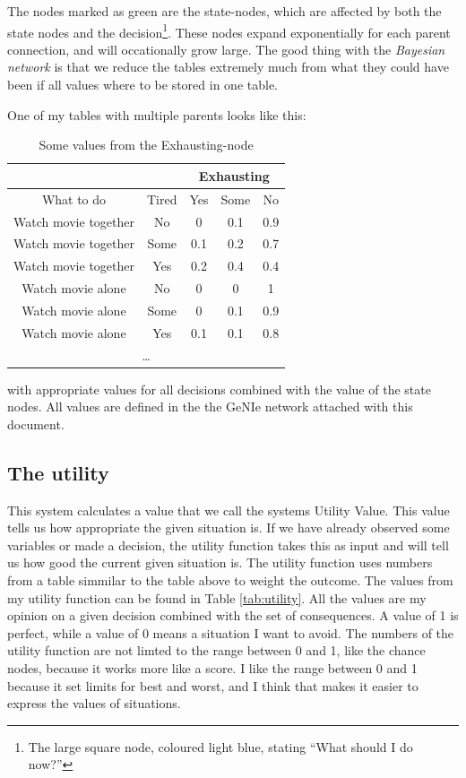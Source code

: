 The nodes marked as green are the state-nodes, which are affected by both
the state nodes and the decision\footnote{The large square node, coloured
light blue, stating ``What should I do now?''}. These nodes expand exponentially for
each parent connection, and will occationally grow large. The good thing with
the \emph{Bayesian network} is that we reduce the tables extremely much from
what they could have been if all values where to be stored in one table.

One of my tables with multiple parents looks like this:
\begin{table}[h!!!!!!!!!!!!!!!!!!]
\begin{tabular}{|c|c||c|c|c|}
\hline
\multicolumn{2}{|c|}{} & \multicolumn{3}{|c|}{Exhausting}\\
\hline
What to do & Tired & Yes & Some & No \\
\hline
\hline
Watch movie together & No & 0 & 0.1 & 0.9\\
Watch movie together & Some & 0.1 & 0.2 & 0.7\\
Watch movie together & Yes & 0.2 & 0.4 & 0.4\\
\hline
Watch movie alone & No & 0 & 0 & 1\\
Watch movie alone & Some & 0 & 0.1 & 0.9\\
Watch movie alone & Yes & 0.1 & 0.1 & 0.8\\
\hline
\multicolumn{5}{c}{\ldots}\\
\end{tabular}
\caption{Some values from the Exhausting-node}
\label{tab:exhaust}
\end{table}

with appropriate values for all decisions combined with the value of the state
nodes. All values are defined in the the GeNIe network attached with this
document.

\subsection{The utility}
This system calculates a value that we call the systems Utility Value. This
value tells us how appropriate the given situation is. If we have already
observed some variables or made a decision, the utility function takes this as
input and will tell us how good the current given situation is. The utility
function uses numbers from a table simmilar to the table above to weight the
outcome. The values from my utility function can be found in Table
\ref{tab:utility}. All the values are my opinion on a given decision combined
with the set of consequences. A value of 1 is perfect, while a value of 0 means
a situation I want to avoid. The numbers of the utility function are not limted
to the range between 0 and 1, like the chance nodes, because it works more like
a score. I like the range between 0 and 1 because it set limits for best and
worst, and I think that makes it easier to express the values of situations.

